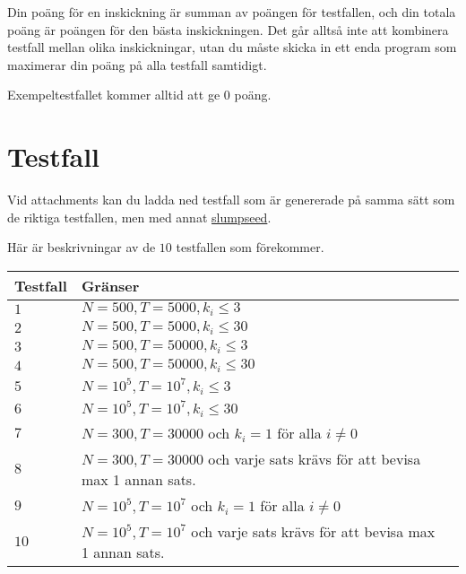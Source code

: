 Din poäng för en inskickning är summan av poängen för testfallen, och din totala poäng är poängen för den bästa inskickningen.
Det går alltså inte att kombinera testfall mellan olika inskickningar, utan du måste skicka in ett enda program som
maximerar din poäng på alla testfall samtidigt.

Exempeltestfallet kommer alltid att ge $0$ poäng.

\section*{Testfall}
Vid attachments kan du ladda ned testfall som är genererade på samma sätt som de riktiga testfallen,
men med annat \href{https://en.wikipedia.org/wiki/Random_seed}{slumpseed}.

Här är beskrivningar av de $10$ testfallen som förekommer.

\noindent
\begin{tabular}{| l | l | l |}
\hline
Testfall & Gränser  \\ \hline
$1$       & $N=500,T=5000,k_i \le 3$  \\ \hline
$2$       & $N=500,T=5000,k_i \le 30$  \\ \hline
$3$       & $N=500,T=50000,k_i \le 3$  \\ \hline
$4$       & $N=500,T=50000,k_i \le 30$  \\ \hline
$5$       & $N=10^5,T=10^7,k_i \le 3$  \\ \hline
$6$       & $N=10^5,T=10^7,k_i \le 30$  \\ \hline
$7$       & $N=300,T=30000$ och $k_i=1$ för alla $i\neq0$\\ \hline
$8$       & $N=300,T=30000$ och varje sats krävs för att bevisa max 1 annan sats. \\ \hline
$9$       & $N=10^5,T=10^7$ och $k_i=1$ för alla $i\neq0$ \\ \hline
$10$      & $N=10^5,T=10^7$ och varje sats krävs för att bevisa max 1 annan sats.  \\ \hline
\end{tabular}

